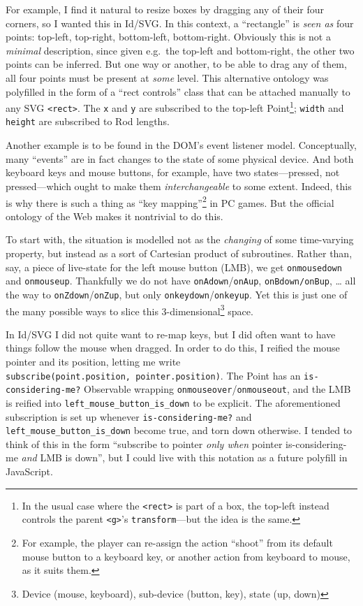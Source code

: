 For example, I find it natural to resize boxes by dragging any of their
four corners, so I wanted this in Id{}/SVG. In this context, a
``rectangle'' is \emph{seen as} four points: top-left, top-right,
bottom-left, bottom-right. Obviously this is not a \emph{minimal}
description, since given e.g.~the top-left and bottom-right, the other
two points can be inferred. But one way or another, to be able to drag
any of them, all four points must be present at \emph{some} level. This
alternative ontology was polyfilled in the form of a ``rect controls''
class that can be attached manually to any SVG
\texttt{\textless{}rect\textgreater{}}. The \texttt{x} and \texttt{y}
are subscribed to the top-left Point\footnote{In the usual case where
  the \texttt{\textless{}rect\textgreater{}} is part of a box, the
  top-left instead controls the parent
  \texttt{\textless{}g\textgreater{}}'s \texttt{transform}---but the
  idea is the same.}; \texttt{width} and \texttt{height} are subscribed
to Rod lengths.

Another example is to be found in the DOM's event listener model.
Conceptually, many ``events'' are in fact changes to the state of some
physical device. And both keyboard keys and mouse buttons, for example,
have two states---pressed, not pressed---which ought to make them
\emph{interchangeable} to some extent. Indeed, this is why there is such
a thing as ``key mapping''\footnote{For example, the player can
  re-assign the action ``shoot'' from its default mouse button to a
  keyboard key, or another action from keyboard to mouse, as it suits
  them.} in PC games. But the official ontology of the Web makes it
nontrivial to do this.

To start with, the situation is modelled not as the \emph{changing} of
some time-varying property, but instead as a sort of Cartesian product
of subroutines. Rather than, say, a piece of live-state for the left
mouse button (LMB), we get \texttt{onmousedown} and \texttt{onmouseup}.
Thankfully we do not have \texttt{onAdown}/\texttt{onAup},
\texttt{onBdown/onBup}, \ldots{} all the way to
\texttt{onZdown}/\texttt{onZup}, but only
\texttt{onkeydown}/\texttt{onkeyup}. Yet this is just one of the many
possible ways to slice this 3-dimensional\footnote{Device (mouse,
  keyboard), sub-device (button, key), state (up, down)} space.

In Id{}/SVG I did not quite want to re-map keys, but I did often want to
have things follow the mouse when dragged. In order to do this, I
reified the mouse pointer and its position, letting me write
\texttt{subscribe(point.position,\ pointer.position)}. The Point has an
\texttt{is-considering-me?} Observable wrapping
\texttt{onmouseover}/\texttt{onmouseout}, and the LMB is reified into
\texttt{left\_mouse\_button\_is\_down} to be explicit. The
aforementioned subscription is set up whenever
\texttt{is-considering-me?} and \texttt{left\_mouse\_button\_is\_down}
become true, and torn down otherwise. I tended to think of this in the
form ``subscribe to pointer \emph{only when} pointer is-considering-me
\emph{and} LMB is down'', but I could live with this notation as a
future polyfill in JavaScript.

